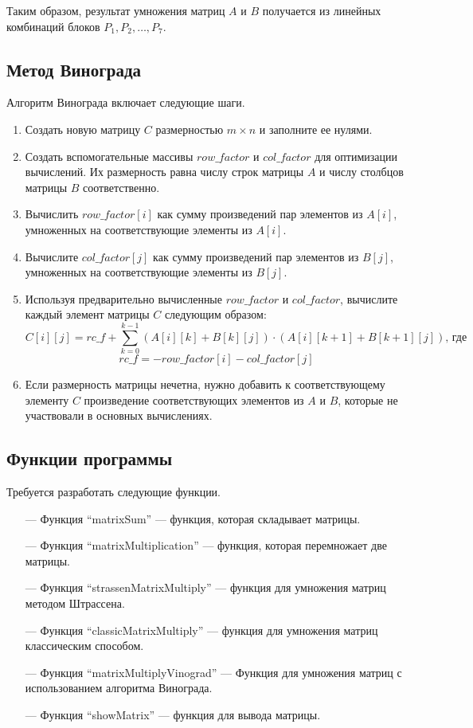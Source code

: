 \documentclass[12pt, a4paper]{article}
\begin{document}
Таким образом, результат умножения матриц $A$ и $B$ получается из линейных 
комбинаций блоков $P_1, P_2, \ldots, P_7$.
\subsection{Метод Винограда}
Алгоритм Винограда включает следующие шаги.
\begin{enumerate}
    \item Создать новую матрицу $C$ размерностью $m \times n$ и заполните ее нулями.
    \item Создать вспомогательные массивы $row\_factor$ и $col\_factor$ для оптимизации вычислений. Их размерность равна числу строк матрицы $A$ и числу столбцов матрицы $B$ соответственно.
    \item Вычислить $row\_factor[i]$ как сумму произведений пар элементов из $A[i]$, умноженных на соответствующие элементы из $A[i]$.
    \item Вычислите $col\_factor[j]$ как сумму произведений пар элементов из $B[j]$, умноженных на соответствующие элементы из $B[j]$.
    \item Используя предварительно вычисленные $row\_factor$ и $col\_factor$, вычислите каждый элемент матрицы $C$ следующим образом: 
    \[ C[i][j] = rc\_f + \sum_{k=0}^{k-1} (A[i][k] + B[k][j]) \cdot (A[i][k+1] + B[k+1][j]) \text{, где}\]  \[ rc\_f = -row\_factor[i] - col\_factor[j] \] 
    \item Если размерность матрицы нечетна, нужно добавить к соответствующему элементу $C$ произведение соответствующих элементов из $A$ и $B$, которые не участвовали в основных вычислениях.
\end{enumerate}
\subsection{Функции программы}
Требуется разработать следующие функции.
\begin{itemize}
    \item[---] Функция ``matrixSum'' --- функция, которая складывает матрицы.
    \item[---] Функция ``matrixMultiplication'' --- функция, которая перемножает две матрицы.
    \item[---] Функция ``strassenMatrixMultiply'' --- функция для умножения матриц методом Штрассена.
    \item[---] Функция ``classicMatrixMultiply'' --- функция для умножения матриц классическим способом.
    \item[---] Функция ``matrixMultiplyVinograd'' ---  Функция для умножения матриц с использованием алгоритма Винограда.
    \item[---] Функция ``showMatrix'' --- функция для вывода матрицы.
\end{itemize}
\newpage
\end{document}
